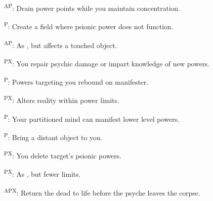 \begin{enumerate*}
      \textsuperscript{AP}: Drain power points while you maintain concentration. %

\item {}\textsuperscript{P}: Create a field where psionic power does not function. %

      \textsuperscript{AP}: As , but affects a touched object.

\item {}\textsuperscript{PX}: You repair psychic damage or impart knowledge of new powers. %

      \textsuperscript{P}: Powers targeting you rebound on manifester. %

\item {}\textsuperscript{PX}: Alters reality within power limits. %

      \textsuperscript{P}: Your partitioned mind can manifest lower level powers. %

      \textsuperscript{P}: Bring a distant object to you.

\item {}\textsuperscript{PX}: You delete target's psionic powers. %


      \textsuperscript{PX}: As , but fewer limits. %

      \textsuperscript{APX}: Return the dead to life before the psyche leaves the corpse.
\end{enumerate*}



